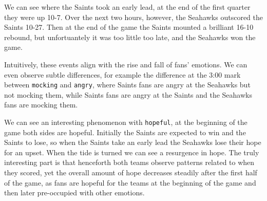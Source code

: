 \documentclass[fontsize=10pt,twocolumn,letterpaper,abstracton]{scrartcl}
\begin{document}
\begin{figure}
\end{figure}

We can see where the Saints took an early lead, at the end of the first quarter they were up 10-7. Over the next two hours, however, the Seahawks outscored the Saints 10-27. Then at the end of the game the Saints mounted a brilliant 16-10 rebound, but unfortuantely it was too little too late, and the Seahawks won the game.

Intuitively, these events align with the rise and fall of fans' emotions. We can even observe subtle differences, for example the difference at the 3:00 mark between \verb|mocking| and \verb|angry|, where Saints fans are angry at the Seahawks but not mocking them, while Saints fans are angry at the Saints and the Seahawks fans are mocking them.

We can see an interesting phenomenon with \verb|hopeful|, at the beginning of the game both sides are hopeful. Initially the Saints are expected to win and the Saints to lose, so when the Saints take an early lead the Seahawks lose their hope for an upset. When the tide is turned we can see a resurgence in hope. The truly interesting part is that henceforth both teams observe patterns related to when they scored, yet the overall amount of hope decreases steadily after the first half of the game, as fans are hopeful for the teams at the beginning of the game and then later pre-occupied with other emotions.
\end{document}
